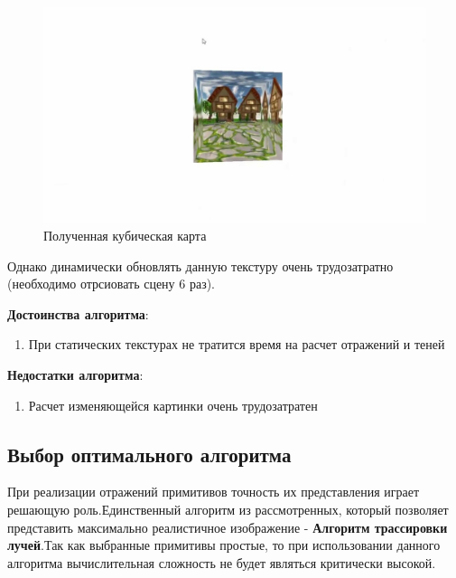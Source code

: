 \documentclass[a4paper,14pt, unknownkeysallowed]{extreport}
\begin{document}
\begin{figure}[H]
	\centering
	\includegraphics[scale=0.4]{cube_maps_real_example}
	\caption{Полученная кубическая карта}
	\label{fig:cube_maps_real_example}
\end{figure}


Однако динамически обновлять данную текстуру очень трудозатратно (необходимо отрсиовать сцену 6 раз).


\textbf{Достоинства алгоритма}:
\begin{enumerate}
	\item При статических текстурах не тратится время на расчет отражений и теней
\end{enumerate}

\textbf{Недостатки алгоритма}:
\begin{enumerate}
	\item Расчет изменяющейся картинки очень трудозатратен
\end{enumerate}

\subsection{Выбор оптимального алгоритма}
При реализации отражений примитивов точность их представления играет решающую роль.Единственный алгоритм из рассмотренных, который позволяет представить максимально
реалистичное изображение - \textbf{Алгоритм трассировки лучей}.Так как выбранные примитивы простые, то при использовании данного алгоритма вычислительная
сложность не будет являться критически высокой.
\end{document}
